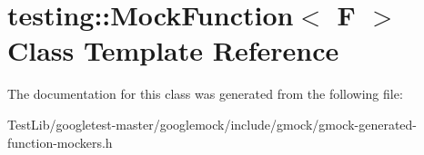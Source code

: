 \hypertarget{classtesting_1_1MockFunction}{}\section{testing\+:\+:Mock\+Function$<$ F $>$ Class Template Reference}
\label{classtesting_1_1MockFunction}


The documentation for this class was generated from the following file\+:\begin{DoxyCompactItemize}
\item 
Test\+Lib/googletest-\/master/googlemock/include/gmock/gmock-\/generated-\/function-\/mockers.\+h\end{DoxyCompactItemize}
